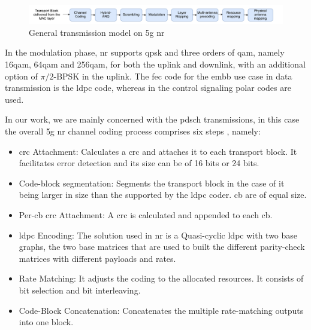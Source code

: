 \begin{figure}[htbp]
\includegraphics[width=\columnwidth]{figures/chp_theory/transmissionmodel.pdf}
\caption{General transmission model on \gls{5g} \gls{nr}}
\label{fig:transmission}
\end{figure}
%
In the modulation phase, \gls{nr} supports \gls{qpsk} and three orders of \gls{qam}, namely 16\gls{qam}, 64\gls{qam} and 256\gls{qam}, for both the uplink and downlink, with an additional option of $\pi/2$-BPSK in the uplink.
%
The \gls{fec} code for the \gls{embb} use case in data transmission is the \gls{ldpc} code, whereas in the control signaling polar codes are used.
%

In our work, we are mainly concerned with the \gls{pdsch} transmissions, in this case the overall \gls{5g} \gls{nr} channel coding process comprises six steps \cite{ErikDahlman5G}, namely:
\begin{itemize}
	\item \Gls{crc} Attachment: Calculates a \gls{crc} and attaches it to each transport block. It facilitates error detection and its size can be of 16 bits or 24 bits.
	\item Code-block segmentation: Segments the transport block in the case of it being larger in size than the supported by the \gls{ldpc} coder. \gls{cb} are of equal size.
	\item Per-\gls{cb} \gls{crc} Attachment: A \gls{crc} is calculated and appended to each \gls{cb}.
	\item \gls{ldpc} Encoding: The solution used in \gls{nr} is a Quasi-cyclic \gls{ldpc} with two base graphs, the two base matrices that are used to built the different parity-check matrices with different payloads and rates.
	\item Rate Matching: It adjusts the coding to the allocated resources. It consists of bit selection and bit interleaving.
	\item Code-Block Concatenation: Concatenates the multiple rate-matching outputs into one block.
\end{itemize}

